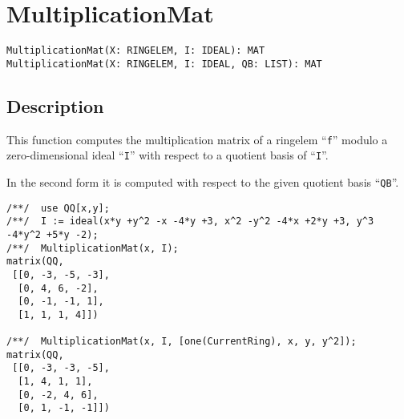 \documentclass[a4paper]{mybook}
\newenvironment{command}{}{} %
\begin{document}
\section{MultiplicationMat}
\label{MultiplicationMat}
\begin{command} %


\begin{Verbatim}[label=syntax, rulecolor=\color{MidnightBlue},
frame=single]
MultiplicationMat(X: RINGELEM, I: IDEAL): MAT
MultiplicationMat(X: RINGELEM, I: IDEAL, QB: LIST): MAT
\end{Verbatim}


\subsection*{Description}

This function computes the multiplication matrix of a ringelem ``\verb&f&''
modulo a zero-dimensional ideal ``\verb&I&'' with respect to a quotient
basis of ``\verb&I&''.
\par 
In the second form it is computed with respect to the given quotient
basis ``\verb&QB&''.
\begin{Verbatim}[label=example, rulecolor=\color{PineGreen}, frame=single]
/**/  use QQ[x,y];
/**/  I := ideal(x*y +y^2 -x -4*y +3, x^2 -y^2 -4*x +2*y +3, y^3 -4*y^2 +5*y -2);
/**/  MultiplicationMat(x, I);
matrix(QQ,
 [[0, -3, -5, -3],
  [0, 4, 6, -2],
  [0, -1, -1, 1],
  [1, 1, 1, 4]])

/**/  MultiplicationMat(x, I, [one(CurrentRing), x, y, y^2]);
matrix(QQ,
 [[0, -3, -3, -5],
  [1, 4, 1, 1],
  [0, -2, 4, 6],
  [0, 1, -1, -1]])
\end{Verbatim}


\end{command} %
\end{document}
